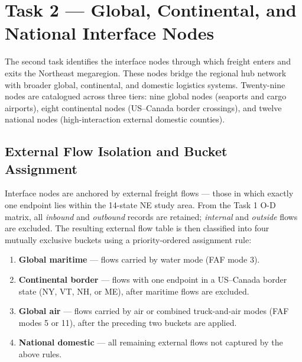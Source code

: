 
\section{Task 2 — Global, Continental, and National Interface Nodes}

The second task identifies the interface nodes through which freight enters and exits the
Northeast megaregion. These nodes bridge the regional hub network with broader global,
continental, and domestic logistics systems. Twenty-nine nodes are catalogued across three
tiers: nine global nodes (seaports and cargo airports), eight continental nodes
(US--Canada border crossings), and twelve national nodes (high-interaction external
domestic counties).

\subsection{External Flow Isolation and Bucket Assignment}

Interface nodes are anchored by external freight flows — those in which exactly one
endpoint lies within the 14-state NE study area. From the Task 1 O-D matrix, all
\textit{inbound} and \textit{outbound} records are retained; \textit{internal} and
\textit{outside} flows are excluded. The resulting external flow table is then classified
into four mutually exclusive buckets using a priority-ordered assignment rule:

\begin{enumerate}
  \item \textbf{Global maritime} — flows carried by water mode (FAF mode 3).
  \item \textbf{Continental border} — flows with one endpoint in a US--Canada border state
        (NY, VT, NH, or ME), after maritime flows are excluded.
  \item \textbf{Global air} — flows carried by air or combined truck-and-air modes (FAF
        modes 5 or 11), after the preceding two buckets are applied.
  \item \textbf{National domestic} — all remaining external flows not captured by the
        above rules.
\end{enumerate}

